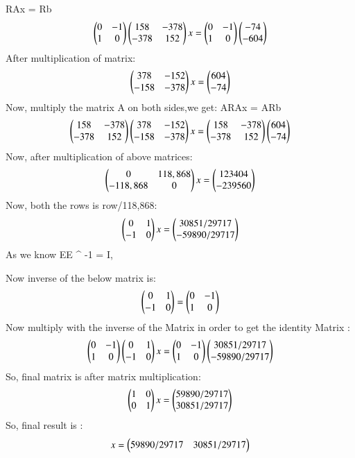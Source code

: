 \documentclass[journal,12pt,twocolumn]{IEEEtran}
\begin{document}
RAx = Rb 
\begin{align}
\begin{pmatrix}0 & -1 \\ 1 & 0\end{pmatrix}
\begin{pmatrix}158 & -378 \\ -378 & 152\end{pmatrix} x = 
\begin{pmatrix}0 & -1 \\ 1 & 0\end{pmatrix}
\begin{pmatrix}-74 \\ -604\end{pmatrix}
\end{align}
After multiplication of matrix:
\begin{align}
\begin{pmatrix}378 & -152 \\ -158 & -378\end{pmatrix} x = 
\begin{pmatrix}604 \\ -74\end{pmatrix}
\end{align}
Now, multiply the matrix A on both sides,we get:
ARAx = ARb 
\begin{align}
\begin{pmatrix}158 & -378 \\ -378 & 152\end{pmatrix}
\begin{pmatrix}378 & -152 \\ -158 & -378\end{pmatrix} x = 
\begin{pmatrix}158 & -378 \\ -378 & 152\end{pmatrix}
\begin{pmatrix}604 \\ -74\end{pmatrix}
\end{align}
Now, after multiplication of above matrices:
\begin{align}
\begin{pmatrix}0 & 118,868 \\ -118,868 & 0 \end{pmatrix} x = 
\begin{pmatrix}123404 \\ -239560 \end{pmatrix}
\end{align}
Now, both the rows is row/118,868: 
\begin{align}
\begin{pmatrix}0 & 1 \\ -1 & 0\end{pmatrix} x = \begin{pmatrix}30851/29717 \\ -59890/29717\end{pmatrix}
\end{align}
As we know EE ^ {-1} = I, 

Now inverse of the below matrix is:
\begin{align}
\begin{pmatrix}0 & 1 \\-1 & 0\end{pmatrix} = \begin{pmatrix}0 & -1 \\ 1 & 0\end{pmatrix}
\end{align}
Now multiply with the inverse of the Matrix in order to get the identity Matrix : 
\begin{align}
\begin{pmatrix}0 & -1 \\ 1 & 0\end{pmatrix}
\begin{pmatrix}0 & 1 \\ -1 & 0\end{pmatrix} x = 
\begin{pmatrix}0 & -1 \\ 1 & 0\end{pmatrix}
\begin{pmatrix}30851/29717 \\ -59890/29717\end{pmatrix}
\end{align}
So, final matrix is after matrix multiplication:
\begin{align}
\begin{pmatrix}1 & 0 \\ 0 & 1\end{pmatrix} x = 
\begin{pmatrix}59890/29717 \\ 30851/29717\end{pmatrix}
\end{align}
So, final result is :
\begin{align}
x = \begin{pmatrix}59890/29717 & 30851/29717\end{pmatrix}
\end{align}
\end{document}

